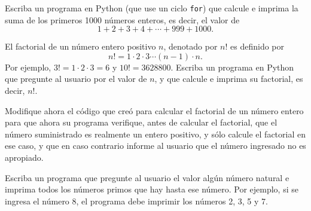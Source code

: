 \documentclass[11pt]{exam}
\begin{document}
\begin{questions}
\item Escriba un programa en Python (que use un ciclo \texttt{for}) que calcule e imprima la suma de los primeros 1000 números enteros, es decir, el valor de 
\begin{equation}
1 + 2 + 3 + 4  + \cdots + 999 + 1000.
\end{equation}

\item El factorial de un número entero positivo $n$, denotado por $n!$ es definido por
\begin{equation}
n!=1\cdot 2\cdot 3\cdots (n-1)\cdot n.
\end{equation}
Por ejemplo, $3!=1\cdot 2\cdot 3=6$ y $10!=3628800$.
Escriba un programa en Python que pregunte al usuario por el valor de $n$, y que calcule e imprima su factorial, es decir, $n!$.

\item Modifique ahora el código que creó para calcular el factorial de un número entero para que ahora su programa verifique, antes de calcular el factorial, que el número suministrado es realmente un entero positivo, y sólo calcule el factorial en ese caso, y que en caso contrario informe al usuario que el número ingresado no es apropiado.

\item Escriba un programa que pregunte al usuario el valor algún número natural e imprima todos los números primos que hay hasta ese número. Por ejemplo, si se ingresa el número 8, el programa debe imprimir los números 2, 3, 5 y 7.

\end{questions}
\end{document}
